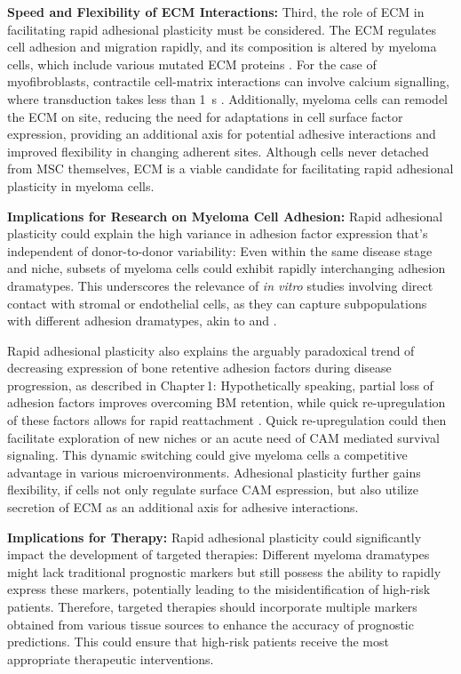\textbf{Speed and Flexibility of ECM Interactions:}
Third, the role of \ac{ECM} in facilitating rapid adhesional plasticity must be
considered. The \ac{ECM} regulates cell adhesion and migration rapidly, and its
composition is altered by myeloma cells, which include various mutated \ac{ECM}
proteins \cite{ibraheemBMMSCsderivedECMModifies2019,
      eversPrognosticValueExtracellular2023}. For the case of myofibroblasts,
contractile cell-matrix interactions can involve calcium signalling, where
transduction takes less than \SI{1}{\second} \cite{yamadaCell3DMatrix2022}.
Additionally, myeloma cells can remodel the \ac{ECM} on site, reducing the need
for adaptations in cell surface factor expression, providing an additional axis
for potential adhesive interactions and improved flexibility in changing
adherent sites. Although \MAina cells never detached from \ac{MSC} themselves,
\ac{ECM} is a viable candidate for facilitating rapid adhesional plasticity in
myeloma cells.



\textbf{Implications for Research on Myeloma Cell Adhesion:}
Rapid adhesional plasticity could explain the high variance in adhesion factor
expression that's independent of donor-to-donor variability: Even within the
same disease stage and niche, subsets of myeloma cells could exhibit rapidly
interchanging adhesion dramatypes. This underscores the relevance of \textit{in
      vitro} studies involving direct contact with stromal or endothelial cells, as
they can capture subpopulations with different adhesion dramatypes, akin to
\MAina and \nMAina.

Rapid adhesional plasticity also explains the arguably paradoxical trend of
decreasing expression of bone retentive adhesion
factors during disease progression, as
described in Chapter\,1: Hypothetically speaking, partial loss of adhesion
factors improves overcoming \ac{BM} retention, while quick re-upregulation of
these factors allows for rapid reattachment . Quick
re-upregulation could then facilitate exploration of new niches or an acute need
of \ac{CAM} mediated survival signaling. This dynamic switching could give
myeloma cells a competitive advantage in various microenvironments. Adhesional
plasticity further gains flexibility, if cells not only regulate surface
\ac{CAM} espression, but also utilize secretion of \ac{ECM} as an additional
axis for adhesive interactions.



\textbf{Implications for Therapy:}
Rapid adhesional plasticity could significantly impact the development of
targeted therapies: Different myeloma dramatypes might lack traditional
prognostic markers but still possess the ability to rapidly express these
markers, potentially leading to the misidentification of high-risk patients.
Therefore, targeted therapies should incorporate multiple markers obtained from
various tissue sources to enhance the accuracy of prognostic predictions. This
could ensure that high-risk patients receive the most appropriate therapeutic
interventions.



